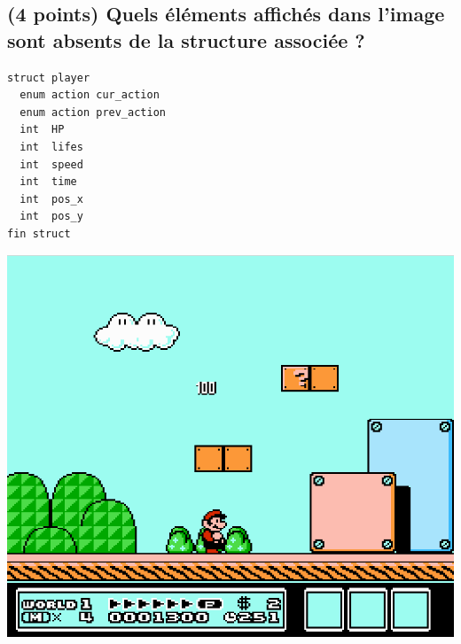 \documentclass[11pt,a4paper]{article}
\begin{document}
\MakeExamTitle                   %




\renewcommand{\thesubsection}{\arabic{subsection}} %



\vfillFirst

\subsection{(4 points) Quels éléments affichés dans l'image sont absents de la structure associée ? }

\begin{table}[h!]
  \centering
  \begin{minipage}{0.4\textwidth}
    \centering
\begin{lstlisting}[style=algorithmique]
struct player
  enum action cur_action
  enum action prev_action
  int  HP
  int  lifes
  int  speed
  int  time
  int  pos_x
  int  pos_y
fin struct \end{lstlisting}
  \end{minipage}
  \hfillx
  \begin{minipage}{0.55\textwidth}
    \centering
\includegraphics[width=\textwidth]{img/mario3.png}
  \end{minipage}
\end{table}
\end{document}
